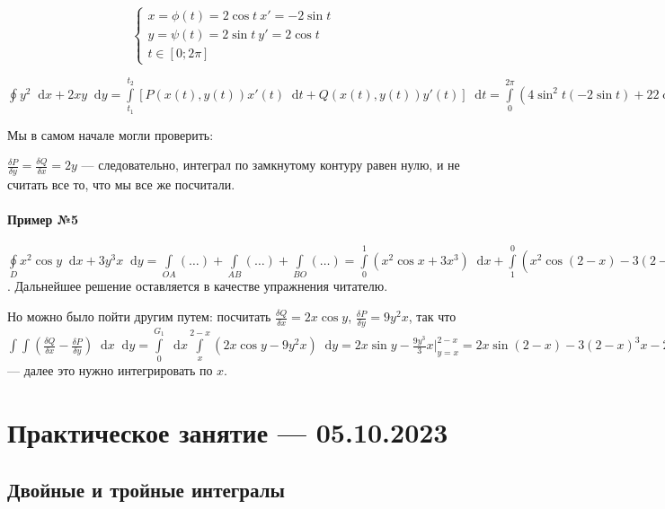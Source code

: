 \documentclass{article}
\newcommand*\diff{\mathop{}\!\mathrm{d}}
\begin{document}
\begin{equation}
    \begin{cases}
        x = \phi(t) = 2 \cos t \ x' = -2 \sin t \\
        y = \psi(t) = 2 \sin t \ y' = 2 \cos t \\
        t \in [0; 2\pi]
    \end{cases}
\end{equation}

$\oint y^2 \diff x + 2 x y \diff y = \int\limits_{t_1}^{t_2} [P(x(t), y(t)) x'(t) \diff t + Q(x(t), y(t)) y'(t)] \diff t = \int\limits_{0}^{2 \pi} (4 \sin^2 t (-2 \sin t) + 2 2 \cos t 2 \sin t 2 \cos t) \diff t = 8 \int\limits_{0}^{2 \pi} \sin t (-\sin^2 t + 2 \cos^2 t) \diff t = -8 \int\limits_{0}^{2 \pi} (-1 + 3\cos^2 t) \diff \cos t = 8 \int\limits_{0}^{2 \pi} (1 - 3 \cos^2 t) \diff \cos t = 8 (\cos t - \frac{3 \cos^3 t}{3}) \bigg|_{0}^{2 \pi} = 0$


Мы в самом начале могли проверить:

$\frac{\delta P}{\delta y} = \frac{\delta Q}{\delta x} = 2y$ — следовательно, интеграл по замкнутому контуру равен нулю, и не считать все то, что мы все же посчитали.

\paragraph{Пример №5}

$\oint\limits_{D} x^2 \cos y \diff x + 3y^3 x \diff y = \int\limits_{OA} (\dots) + \int\limits_{AB} (\dots) + \int\limits_{BO} (\dots) = \int\limits_{0}^{1} (x^2 \cos x + 3x^3) \diff x + \int\limits_{1}^{0} (x^2 \cos (2 - x) - 3 (2 - x)^3 x) \diff x + 0 = \dots$. Дальнейшее решение оставляется в качестве упражнения читателю.

Но можно было пойти другим путем: посчитать $\frac{\delta Q}{\delta x} = 2 x \cos y$, $\frac{\delta P}{\delta y} = 9 y^2 x$, так что $\int\int (\frac{\delta Q}{\delta x} - \frac{\delta P}{\delta y}) \diff x \diff y = \int\limits_{0}^{G_1} \diff x \int\limits_{x}^{2 - x} (2x \cos y - 9y^2 x) \diff y = 2 x \sin y - \frac{9 y^3}{3} x \bigg|_{y = x}^{2 - x} = 2 x \sin (2 - x) - 3 (2 - x)^3 x - 2x \sin x - 3x^4$ — далее это нужно интегрировать по $x$.

\section{Практическое занятие — 05.10.2023}

\subsection{Двойные и тройные интегралы}
\end{document}
